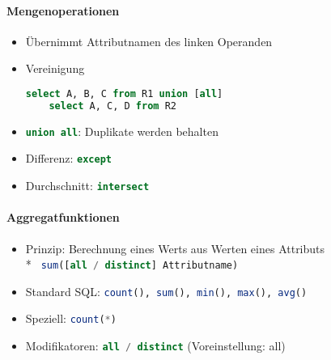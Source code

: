 \paragraph{Mengenoperationen}
\begin{itemize}
	\item Übernimmt Attributnamen des linken Operanden
	\item Vereinigung
	\begin{lstlisting}[language=sql]
select A, B, C from R1 union [all]
	select A, C, D from R2
	\end{lstlisting}
	\item \lstinline[language=sql]{union all}: Duplikate werden behalten
	\item Differenz: \lstinline[language=sql]{except}
	\item Durchschnitt: \lstinline[language=sql]{intersect}
\end{itemize}

\paragraph{Aggregatfunktionen}
\begin{itemize}
	\item Prinzip: Berechnung eines Werts aus Werten eines Attributs\\*
		\lstinline[language=sql]{ sum([all / distinct] Attributname) }
	\item Standard SQL: \lstinline[language=sql]{count(), sum(), min(), max(), avg()}
	\item Speziell: \lstinline[language=sql]{count(*)}
	\item Modifikatoren: \lstinline[language=sql]{all / distinct} (Voreinstellung: all)
\end{itemize}

